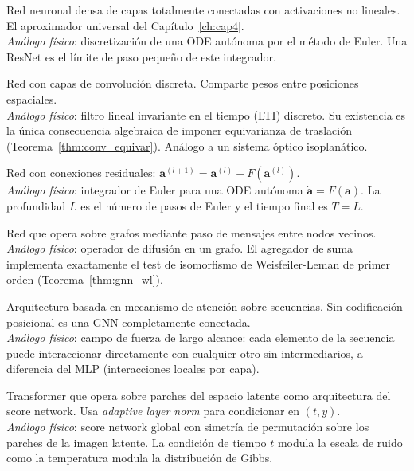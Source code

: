 \begin{description}[leftmargin=0pt, labelwidth=!, labelsep=1em,
  font=\normalfont\bfseries, style=nextline]

\item[MLP --- \textit{Multilayer Perceptron}]
Red neuronal densa de capas totalmente conectadas con activaciones no
lineales. El aproximador universal del Capítulo~\ref{ch:cap4}.\\
\emph{Análogo físico}: discretización de una ODE autónoma por el método
de Euler. Una ResNet es el límite de paso pequeño de este integrador.

\item[CNN --- \textit{Convolutional Neural Network}]
Red con capas de convolución discreta. Comparte pesos entre posiciones
espaciales.\\
\emph{Análogo físico}: filtro lineal invariante en el tiempo (LTI) discreto.
Su existencia es la única consecuencia algebraica de imponer equivarianza
de traslación (Teorema~\ref{thm:conv_equivar}). Análogo a un sistema
óptico isoplanático.

\item[ResNet --- \textit{Residual Network}]
Red con conexiones residuales: $\bm{a}^{(l+1)} = \bm{a}^{(l)} +
F(\bm{a}^{(l)})$.\\
\emph{Análogo físico}: integrador de Euler para una ODE autónoma
$\dot{\bm{a}} = F(\bm{a})$. La profundidad $L$ es el número de pasos
de Euler y el tiempo final es $T = L$.

\item[GNN --- \textit{Graph Neural Network}]
Red que opera sobre grafos mediante paso de mensajes entre nodos vecinos.\\
\emph{Análogo físico}: operador de difusión en un grafo. El agregador
de suma implementa exactamente el test de isomorfismo de Weisfeiler-Leman
de primer orden (Teorema~\ref{thm:gnn_wl}).

\item[Transformer]
Arquitectura basada en mecanismo de atención sobre secuencias. Sin
codificación posicional es una GNN completamente conectada.\\
\emph{Análogo físico}: campo de fuerza de largo alcance: cada elemento
de la secuencia puede interaccionar directamente con cualquier otro sin
intermediarios, a diferencia del MLP (interacciones locales por capa).

\item[DiT --- \textit{Diffusion Transformer}]
Transformer que opera sobre parches del espacio latente como arquitectura
del score network. Usa \textit{adaptive layer norm} para condicionar en
$(t, y)$.\\
\emph{Análogo físico}: score network global con simetría de permutación
sobre los parches de la imagen latente. La condición de tiempo $t$ modula
la escala de ruido como la temperatura modula la distribución de Gibbs.


\end{description}
